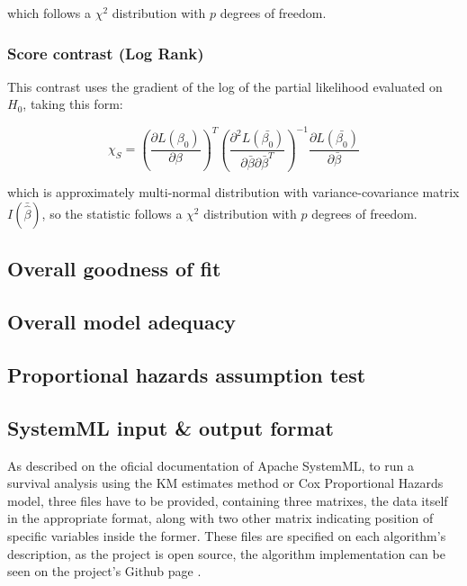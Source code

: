 \documentclass[11pt]{book} %
\begin{document}
        which follows a $\chi^2$ distribution with $p$ degrees of freedom.

      \subsubsection{Score contrast (Log Rank)}

        This contrast uses the gradient of the log of the partial likelihood evaluated on $H_0$, taking this form:

        \begin{equation}
          \chi_{S} = \left( \frac{\partial L(\beta_0)}{\partial \beta} \right)^T \left( \frac{\partial^2L(\bar{\beta_0})}{\partial\bar{\beta} \partial\bar{\beta}^T} \right)^{-1} \frac{\partial L(\bar{\beta_0})}{\partial\bar{\beta}}
          \label{eq:cox-score-contrast}
        \end{equation}

        which is approximately multi-normal distribution with variance-covariance matrix $I(\bar{\widehat{\beta}})$, so the statistic follows a $\chi^2$ distribution with $p$ degrees of freedom.

    \subsection{Overall goodness of fit}
    \subsection{Overall model adequacy}
    \subsection{Proportional hazards assumption test}





  \subsection{SystemML input \& output format}

    As described on the oficial documentation of Apache SystemML, to run a survival analysis using the KM estimates method or Cox Proportional Hazards model, three files have to be provided, containing three matrixes, the data itself in the appropriate format, along with two other matrix indicating position of specific variables inside the former. These files are specified on each algorithm's description, as the project is open source, the algorithm implementation can be seen on the project's Github page \cite{systemml_github_page}.
\end{document}
